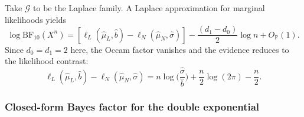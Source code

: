 \documentclass[11pt]{article}
\newcommand{\1}{\mathbf{1}}
\newcommand{\PP}{\mathbb{P}}
\theoremstyle{plain}
\theoremstyle{definition}
\theoremstyle{remark}
\begin{document}
Take $\mathcal{G}$ to be the Laplace family.
A Laplace approximation for marginal likelihoods yields
\begin{equation}\label{eq:bf-laplace-approx}
\log \mathrm{BF}_{10}(X^n)
=
[\ell_L(\hat\mu_L,\hat b)-\ell_N(\hat\mu_N,\hat\sigma)]
-\frac{(d_1-d_0)}{2}\log n
+O_{\PP}(1).
\end{equation}
Since $d_0=d_1=2$ here, the Occam factor vanishes and the evidence reduces to the likelihood contrast:
\begin{equation}\label{eq:bf-laplace-contrast}
\ell_L(\hat\mu_L,\hat b)-\ell_N(\hat\mu_N,\hat\sigma)
=
n\log\!\Big(\frac{\hat\sigma}{\hat b}\Big)
+\frac{n}{2}\log(2\pi) - \frac{n}{2}.
\end{equation}

\subsubsection{Closed-form Bayes factor for the double exponential}
\end{document}
